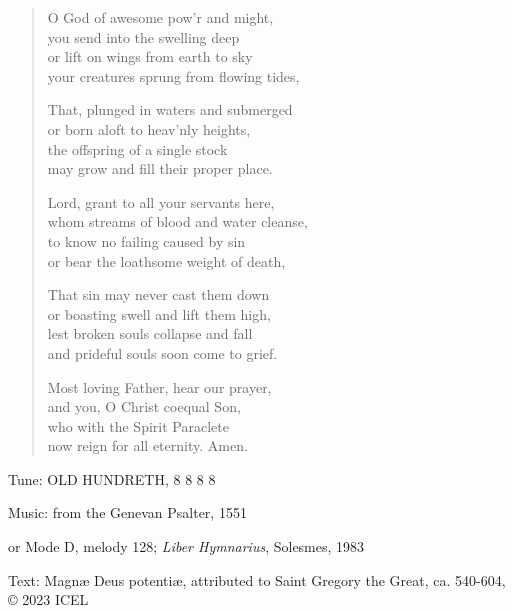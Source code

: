 \hymn

\begin{verse}
O God of awesome pow’r and might,\\
you send into the swelling deep\\
or lift on wings from earth to sky\\
your creatures sprung from flowing tides,

That, plunged in waters and submerged\\
or born aloft to heav’nly heights,\\
the offspring of a single stock\\
may grow and fill their proper place.

Lord, grant to all your servants here,\\
whom streams of blood and water cleanse,\\
to know no failing caused by sin\\
or bear the loathsome weight of death,

That sin may never cast them down\\
or boasting swell and lift them high,\\
lest broken souls collapse and fall\\
and prideful souls soon come to grief.

Most loving Father, hear our prayer,\\
and you, O Christ coequal Son,\\
who with the Spirit Paraclete\\
now reign for all eternity. Amen.
\end{verse}

\begin{hymnsource}
Tune: OLD HUNDRETH, 8 8 8 8

Music: from the Genevan Psalter, 1551

or Mode D, melody 128; \emph{Liber Hymnarius}, Solesmes, 1983

Text: Magnæ Deus potentiæ, attributed to Saint Gregory the Great, ca. 540-604, © 2023 ICEL
\end{hymnsource}